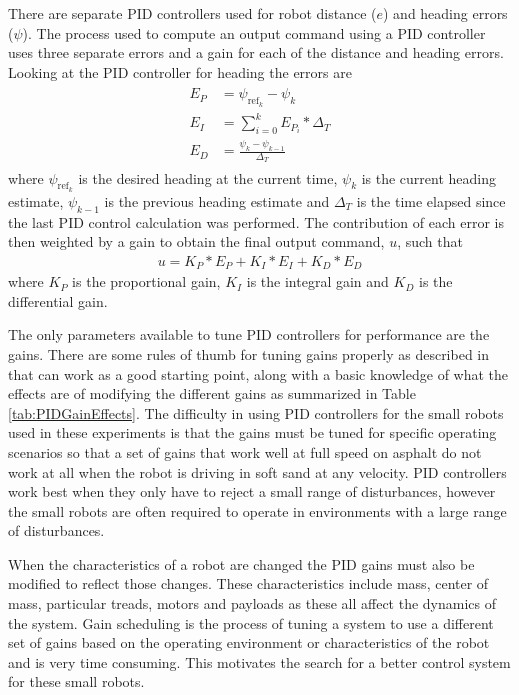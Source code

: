 There are separate PID controllers used for robot distance ($e$) and heading errors ($\psi$). The process used to compute an output command using a PID controller uses three separate errors and a gain for each of the distance and heading errors. Looking at the PID controller for heading the errors are
\begin{align*}
\begin{split}
E_P &= \psi_{\text{ref}_k} - \psi_k \\
E_I &= \sum_{i=0}^{k}E_{P_i}*\Delta_T \\
E_D &= \frac{\psi_k - \psi_{k-1}}{\Delta_T}
\end{split}
\end{align*}
where $\psi_{\text{ref}_k}$ is the desired heading at the current time, $\psi_k$ is the current heading estimate, $\psi_{k-1}$ is the previous heading estimate and $\Delta_T$ is the time elapsed since the last PID control calculation was performed. The contribution of each error is then weighted by a gain to obtain the final output command, $u$, such that
\begin{align*}
u = K_P*E_P + K_I*E_I + K_D*E_D
\end{align*}
where $K_P$ is the proportional gain, $K_I$ is the integral gain and $K_D$ is the differential gain.

The only parameters available to tune PID controllers for performance are the gains. There are some rules of thumb for tuning gains properly as described in \cite{ZeiglerNichols42} that can work as a good starting point, along with a basic knowledge of what the effects are of modifying the different gains as summarized in Table \ref{tab:PIDGainEffects}. The difficulty in using PID controllers for the small robots used in these experiments is that the gains must be tuned for specific operating scenarios so that a set of gains that work well at full speed on asphalt do not work at all when the robot is driving in soft sand at any velocity. PID controllers work best when they only have to reject a small range of disturbances, however the small robots are often required to operate in environments with a large range of disturbances.

When the characteristics of a robot are changed the PID gains must also be modified to reflect those changes. These characteristics include mass, center of mass, particular treads, motors and payloads as these all affect the dynamics of the system. Gain scheduling is the process of tuning a system to use a different set of gains based on the operating environment or characteristics of the robot and is very time consuming. This motivates the search for a better control system for these small robots.

